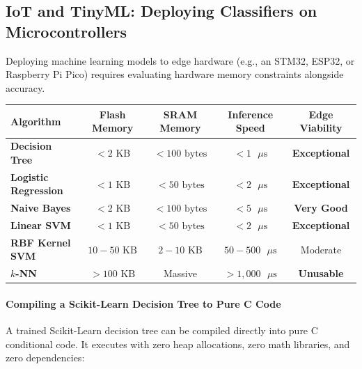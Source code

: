 \subsection{IoT and TinyML: Deploying Classifiers on Microcontrollers}\label{subsec:classification_iot}

\begin{iotbox}
Deploying machine learning models to edge hardware (e.g., an STM32, ESP32, or Raspberry Pi Pico) requires evaluating hardware memory constraints alongside accuracy.

\begin{center}
\small
\renewcommand{\arraystretch}{1.2}
\begin{tabular}{lcccc}
\toprule
\textbf{Algorithm} & \textbf{Flash Memory} & \textbf{SRAM Memory} & \textbf{Inference Speed} & \textbf{Edge Viability} \\
\midrule
\textbf{Decision Tree} & $< 2\text{ KB}$ & $< 100\text{ bytes}$ & $< 1\text{ }\mu\text{s}$ & \textbf{Exceptional} \\
\textbf{Logistic Regression} & $< 1\text{ KB}$ & $< 50\text{ bytes}$ & $< 2\text{ }\mu\text{s}$ & \textbf{Exceptional} \\
\textbf{Naive Bayes} & $< 2\text{ KB}$ & $< 100\text{ bytes}$ & $< 5\text{ }\mu\text{s}$ & \textbf{Very Good} \\
\textbf{Linear SVM} & $< 1\text{ KB}$ & $< 50\text{ bytes}$ & $< 2\text{ }\mu\text{s}$ & \textbf{Exceptional} \\
\textbf{RBF Kernel SVM} & $10-50\text{ KB}$ & $2-10\text{ KB}$ & $50-500\text{ }\mu\text{s}$ & Moderate \\
\textbf{$k$-NN} & $> 100\text{ KB}$ & Massive & $> 1{,}000\text{ }\mu\text{s}$ & \textbf{Unusable} \\
\bottomrule
\end{tabular}
\end{center}

\paragraph{Compiling a Scikit-Learn Decision Tree to Pure C Code}
A trained Scikit-Learn decision tree can be compiled directly into pure C conditional code. It executes with zero heap allocations, zero math libraries, and zero dependencies:


\end{iotbox}

